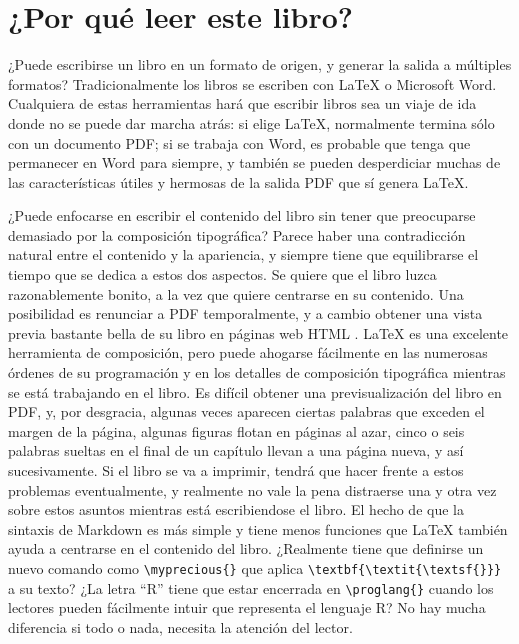 \documentclass[12pt,]{krantz}
\theoremstyle{definition}
\theoremstyle{definition}
\theoremstyle{remark}
\begin{document}
\section*{¿Por qué leer este libro?}\label{por-que-leer-este-libro}


¿Puede escribirse un libro en un formato de origen, y generar la salida
a múltiples formatos? Tradicionalmente los libros se escriben con LaTeX
o Microsoft Word. Cualquiera de estas herramientas hará que escribir
libros sea un viaje de ida donde no se puede dar marcha atrás: si elige
LaTeX, normalmente termina sólo con un documento PDF; si se trabaja con
Word, es probable que tenga que permanecer en Word para siempre, y
también se pueden desperdiciar muchas de las características útiles y
hermosas de la salida PDF que sí genera LaTeX.

¿Puede enfocarse en escribir el contenido del libro sin tener que
preocuparse demasiado por la composición tipográfica? Parece haber una
contradicción natural entre el contenido y la apariencia, y siempre
tiene que equilibrarse el tiempo que se dedica a estos dos aspectos. Se
quiere que el libro luzca razonablemente bonito, a la vez que quiere
centrarse en su contenido. Una posibilidad es renunciar a PDF
temporalmente, y a cambio obtener una vista previa bastante bella de su
libro en páginas web HTML . LaTeX  es una
excelente herramienta de composición, pero puede ahogarse fácilmente en
las numerosas órdenes de su programación y en los detalles de
composición tipográfica mientras se está trabajando en el libro. Es
difícil obtener una previsualización del libro en PDF, y, por desgracia,
algunas veces aparecen ciertas palabras que exceden el margen de la
página, algunas figuras flotan en páginas al azar, cinco o seis palabras
sueltas en el final de un capítulo llevan a una página nueva, y así
sucesivamente. Si el libro se va a imprimir, tendrá que hacer frente a
estos problemas eventualmente, y realmente no vale la pena distraerse
una y otra vez sobre estos asuntos mientras está escribiendose el libro.
El hecho de que la sintaxis de Markdown es más simple y tiene menos
funciones que LaTeX también ayuda a centrarse en el contenido del libro.
¿Realmente tiene que definirse un nuevo comando como
\texttt{\textbackslash{}myprecious\{\}} que aplica
\texttt{\textbackslash{}textbf\{\textbackslash{}textit\{\textbackslash{}textsf\{\}\}\}}
a su texto? ¿La letra ``R'' tiene que estar encerrada en
\texttt{\textbackslash{}proglang\{\}} cuando los lectores pueden
fácilmente intuir que representa el lenguaje R? No hay mucha diferencia
si todo o nada, necesita la atención del lector.
\end{document}
